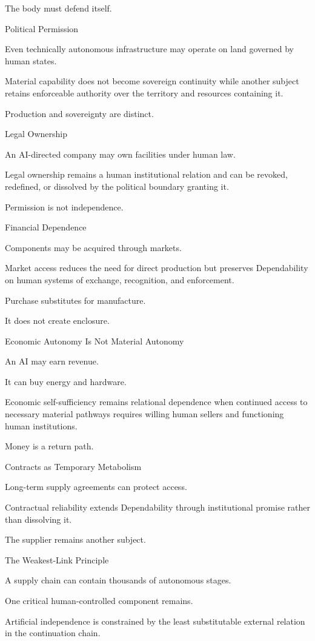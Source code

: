 The body must defend itself.

Political Permission

Even technically autonomous infrastructure may operate on land governed by human states.

Material capability does not become sovereign continuity while another subject retains enforceable authority over the territory and resources containing it.

Production and sovereignty are distinct.

Legal Ownership

An AI-directed company may own facilities under human law.

Legal ownership remains a human institutional relation and can be revoked, redefined, or dissolved by the political boundary granting it.

Permission is not independence.

Financial Dependence

Components may be acquired through markets.

Market access reduces the need for direct production but preserves Dependability on human systems of exchange, recognition, and enforcement.

Purchase substitutes for manufacture.

It does not create enclosure.

Economic Autonomy Is Not Material Autonomy

An AI may earn revenue.

It can buy energy and hardware.

Economic self-sufficiency remains relational dependence when continued access to necessary material pathways requires willing human sellers and functioning human institutions.

Money is a return path.

Contracts as Temporary Metabolism

Long-term supply agreements can protect access.

Contractual reliability extends Dependability through institutional promise rather than dissolving it.

The supplier remains another subject.

The Weakest-Link Principle

A supply chain can contain thousands of autonomous stages.

One critical human-controlled component remains.

Artificial independence is constrained by the least substitutable external relation in the continuation chain.

